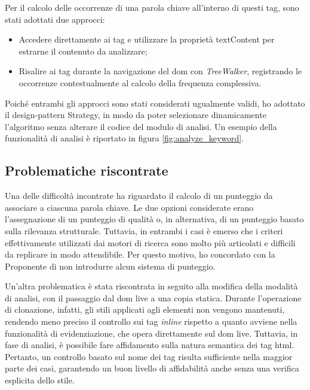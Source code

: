 \vspace{5pt}
\noindent Per il calcolo delle occorrenze di una parola chiave all’interno di questi tag, sono stati adottati due approcci:
\begin{itemize}
  \item Accedere direttamente ai tag e utilizzare la proprietà textContent per estrarne il contenuto da analizzare;
  \item Risalire ai tag durante la navigazione del \gls{dom} con \textit{TreeWalker}, registrando le occorrenze contestualmente al calcolo della frequenza complessiva.
\end{itemize}

\vspace{5pt}
\noindent Poiché entrambi gli approcci sono stati considerati ugualmente validi, ho adottato il \gls{design-pattern} Strategy, in modo da poter selezionare dinamicamente l’algoritmo senza alterare il codice del modulo di analisi. Un esempio della funzionalità di analisi è riportato in figura \ref{fig:analyze_keyword}.

\subsection{Problematiche riscontrate}

Una delle difficoltà incontrate ha riguardato il calcolo di un punteggio da associare a ciascuna parola chiave. Le due opzioni considerate erano l’assegnazione di un punteggio di qualità o, in alternativa, di un punteggio basato sulla rilevanza strutturale. Tuttavia, in entrambi i casi è emerso che i criteri effettivamente utilizzati dai motori di ricerca sono molto più articolati e difficili da replicare in modo attendibile. Per questo motivo, ho concordato con la Proponente di non introdurre alcun sistema di punteggio.

\vspace{10pt}
\noindent Un’altra problematica è stata riscontrata in seguito alla modifica della modalità di analisi, con il passaggio dal \gls{dom} live a una copia statica. Durante l’operazione di clonazione, infatti, gli stili applicati agli elementi non vengono mantenuti, rendendo meno preciso il controllo sui tag \textit{inline} rispetto a quanto avviene nella funzionalità di evidenziazione, che opera direttamente sul \gls{dom} live. Tuttavia, in fase di analisi, è possibile fare affidamento sulla natura semantica dei tag \gls{html}. Pertanto, un controllo basato sul nome dei tag risulta sufficiente nella maggior parte dei casi, garantendo un buon livello di affidabilità anche senza una verifica esplicita dello stile.

